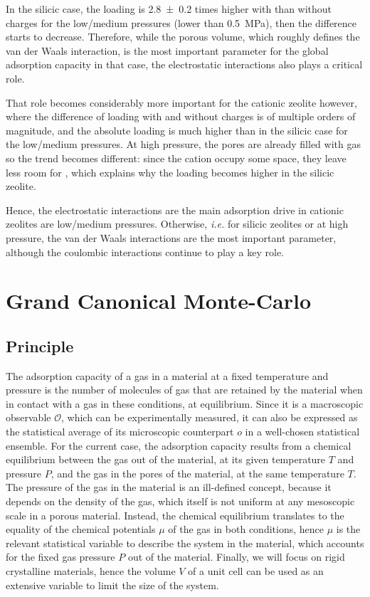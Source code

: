 \documentclass[main.tex]{subfiles}
\begin{document}
In the silicic case, the loading is \num{2.8\pm0.2} times higher with than without charges for the low/medium pressures (lower than \qty{0.5}{MPa}), then the difference starts to decrease. Therefore, while the porous volume, which roughly defines the van der Waals interaction, is the most important parameter for the global adsorption capacity in that case, the electrostatic interactions also plays a critical role.

That role becomes considerably more important for the cationic zeolite however, where the difference of loading with and without charges is of multiple orders of magnitude, and the absolute loading is much higher than in the silicic case for the low/medium pressures. At high pressure, the pores are already filled with gas so the trend becomes different: since the cation occupy some space, they leave less room for , which explains why the loading becomes higher in the silicic zeolite.

Hence, the electrostatic interactions are the main adsorption drive in cationic zeolites are low/medium pressures. Otherwise, \textit{i.e.} for silicic zeolites or at high pressure, the van der Waals interactions are the most important parameter, although the coulombic interactions continue to play a key role.


\section{Grand Canonical Monte-Carlo}
\label{GCMC}

\subsection{Principle}

The adsorption capacity of a gas in a material at a fixed temperature and pressure is the number of molecules of gas that are retained by the material when in contact with a gas in these conditions, at equilibrium. Since it is a macroscopic observable $\mathcal O$, which can be experimentally measured, it can also be expressed as the statistical average of its microscopic counterpart $o$ in a well-chosen statistical ensemble. For the current case, the adsorption capacity results from a chemical equilibrium between the gas out of the material, at its given temperature $T$ and pressure $P$, and the gas in the pores of the material, at the same temperature $T$. The pressure of the gas in the material is an ill-defined concept, because it depends on the density of the gas, which itself is not uniform at any mesoscopic scale in a porous material. Instead, the chemical equilibrium translates to the equality of the chemical potentials $\mu$ of the gas in both conditions, hence $\mu$ is the relevant statistical variable to describe the system in the material, which accounts for the fixed gas pressure $P$ out of the material. Finally, we will focus on rigid crystalline materials, hence the volume $V$ of a unit cell can be used as an extensive variable to limit the size of the system.
\end{document}
